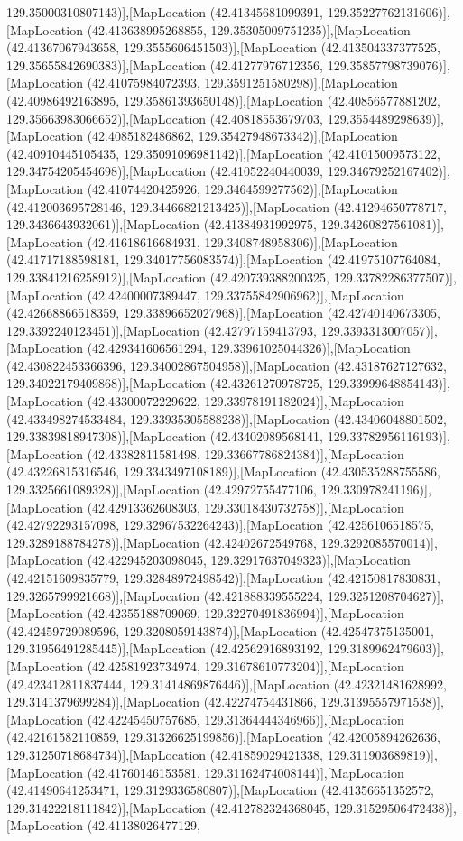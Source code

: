 129.35000310807143)],[MapLocation (42.41345681099391, 129.35227762131606)],[MapLocation (42.413638995268855, 129.35305009751235)],[MapLocation (42.41367067943658, 129.3555606451503)],[MapLocation (42.413504337377525, 129.35655842690383)],[MapLocation (42.41277976712356, 129.35857798739076)],[MapLocation (42.41075984072393, 129.3591251580298)],[MapLocation (42.40986492163895, 129.35861393650148)],[MapLocation (42.40856577881202, 129.35663983066652)],[MapLocation (42.40818553679703, 129.3554489298639)],[MapLocation (42.4085182486862, 129.35427948673342)],[MapLocation (42.40910445105435, 129.35091096981142)],[MapLocation (42.41015009573122, 129.34754205454698)],[MapLocation (42.41052240440039, 129.34679252167402)],[MapLocation (42.41074420425926, 129.3464599277562)],[MapLocation (42.412003695728146, 129.34466821213425)],[MapLocation (42.41294650778717, 129.3436643932061)],[MapLocation (42.41384931992975, 129.34260827561081)],[MapLocation (42.41618616684931, 129.3408748958306)],[MapLocation (42.41717188598181, 129.34017756083574)],[MapLocation (42.41975107764084, 129.33841216258912)],[MapLocation (42.420739388200325, 129.33782286377507)],[MapLocation (42.42400007389447, 129.33755842906962)],[MapLocation (42.42668866518359, 129.33896652027968)],[MapLocation (42.42740140673305, 129.3392240123451)],[MapLocation (42.42797159413793, 129.3393313007057)],[MapLocation (42.429341606561294, 129.33961025044326)],[MapLocation (42.430822453366396, 129.34002867504958)],[MapLocation (42.43187627127632, 129.34022179409868)],[MapLocation (42.43261270978725, 129.33999648854143)],[MapLocation (42.43300072229622, 129.33978191182024)],[MapLocation (42.433498274533484, 129.33935305588238)],[MapLocation (42.43406048801502, 129.33839818947308)],[MapLocation (42.43402089568141, 129.33782956116193)],[MapLocation (42.43382811581498, 129.33667786824384)],[MapLocation (42.43226815316546, 129.3343497108189)],[MapLocation (42.430535288755586, 129.3325661089328)],[MapLocation (42.42972755477106, 129.330978241196)],[MapLocation (42.42913362608303, 129.33018430732758)],[MapLocation (42.42792293157098, 129.32967532264243)],[MapLocation (42.4256106518575, 129.3289188784278)],[MapLocation (42.42402672549768, 129.3292085570014)],[MapLocation (42.422945203098045, 129.32917637049323)],[MapLocation (42.42151609835779, 129.32848972498542)],[MapLocation (42.42150817830831, 129.3265799921668)],[MapLocation (42.421888339555224, 129.3251208704627)],[MapLocation (42.42355188709069, 129.32270491836994)],[MapLocation (42.42459729089596, 129.3208059143874)],[MapLocation (42.42547375135001, 129.31956491285445)],[MapLocation (42.42562916893192, 129.3189962479603)],[MapLocation (42.42581923734974, 129.31678610773204)],[MapLocation (42.423412811837444, 129.31414869876446)],[MapLocation (42.42321481628992, 129.3141379699284)],[MapLocation (42.42274754431866, 129.31395557971538)],[MapLocation (42.42245450757685, 129.31364444346966)],[MapLocation (42.42161582110859, 129.31326625199856)],[MapLocation (42.42005894262636, 129.31250718684734)],[MapLocation (42.41859029421338, 129.311903689819)],[MapLocation (42.41760146153581, 129.31162474008144)],[MapLocation (42.41490641253471, 129.3129336580807)],[MapLocation (42.41356651352572, 129.31422218111842)],[MapLocation (42.412782324368045, 129.31529506472438)],[MapLocation (42.41138026477129, 